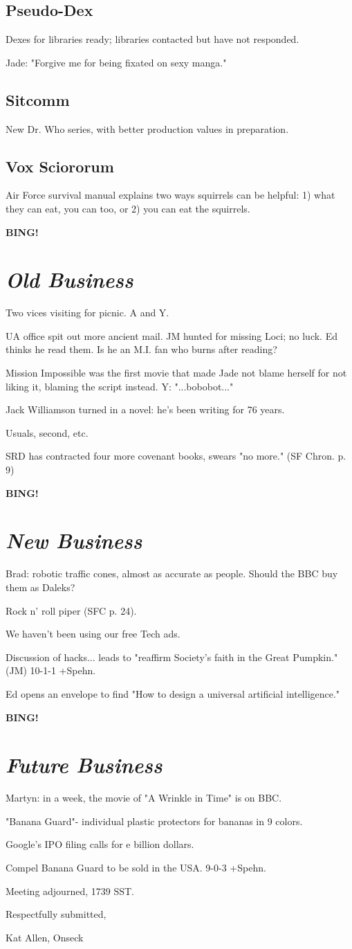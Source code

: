\documentclass[10pt]{article}
\newcommand{\bing}{{\bf BING!} }
\newcommand{\goto}[1]{\bing \vskip 12pt \section*{{\em{#1}}}}
\begin{document}
\subsection*{Pseudo-Dex}
Dexes for libraries ready; libraries contacted but have not responded.

Jade: "Forgive me for being fixated on sexy manga."

\subsection*{Sitcomm}
New Dr. Who series, with better production values in preparation.

\subsection*{Vox Sciororum}
Air Force survival manual explains two ways squirrels can be helpful: 1) what they can eat, you can too, or 2) you can eat the squirrels.

\goto{Old Business}

Two vices visiting for picnic. A and Y.

UA office spit out more ancient mail. JM hunted for missing Loci; no luck. Ed thinks he read them. Is he an M.I. fan who burns after reading?

Mission Impossible was the first movie that made Jade not blame herself for not liking it, blaming the script instead. Y: "...bobobot..."

Jack Williamson turned in a novel: he's been writing for 76 years.

Usuals, second, etc.

SRD has contracted four more covenant books, swears "no more." (SF Chron. p. 9)

\goto{New Business}

Brad: robotic traffic cones, almost as accurate as people. Should the BBC buy them as Daleks?

Rock n' roll piper (SFC p. 24).

We haven't been using our free Tech ads.

Discussion of hacks... leads to "reaffirm Society's faith in the Great Pumpkin." (JM) 10-1-1 +Spehn.

Ed opens an envelope to find "How to design a universal artificial intelligence."

\goto{Future Business}

Martyn: in a week, the movie of "A Wrinkle in Time" is on BBC.

"Banana Guard"- individual plastic protectors for bananas in 9 colors.

Google's IPO filing calls for e billion dollars.

Compel Banana Guard to be sold in the USA. 9-0-3 +Spehn.

\vspace{12pt}

\noindent
Meeting adjourned, 1739 SST.

\vspace{18pt}

\centerline{Respectfully submitted,}
\centerline{Kat Allen,  Onseck}
\end{document}
